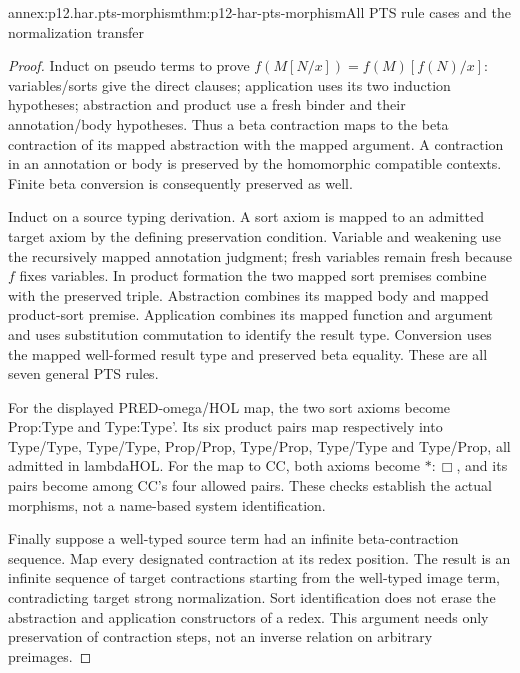 \begin{annexitem}{annex:p12.har.pts-morphism}{thm:p12-har-pts-morphism}{All PTS rule cases and the normalization transfer}
\begin{proof}
Induct on pseudo terms to prove
\(f(M[N/x])=f(M)[f(N)/x]\): variables/sorts give the direct
clauses; application uses its two induction hypotheses; abstraction
and product use a fresh binder and their annotation/body hypotheses.
Thus a beta contraction maps to the beta contraction of its mapped
abstraction with the mapped argument. A contraction in an annotation
or body is preserved by the homomorphic compatible contexts. Finite
beta conversion is consequently preserved as well.

Induct on a source typing derivation. A sort axiom is mapped to an
admitted target axiom by the defining preservation condition. Variable
and weakening use the recursively mapped annotation judgment; fresh
variables remain fresh because \(f\) fixes variables. In product
formation the two mapped sort premises combine with the preserved
triple. Abstraction combines its mapped body and mapped product-sort
premise. Application combines its mapped function and argument and
uses substitution commutation to identify the result type. Conversion
uses the mapped well-formed result type and preserved beta equality.
These are all seven general PTS rules.

For the displayed PRED-omega/HOL map, the two sort axioms become
Prop:Type and Type:Type'. Its six product pairs map respectively into
Type/Type, Type/Type, Prop/Prop, Type/Prop, Type/Type and Type/Prop,
all admitted in lambdaHOL. For the map to CC, both axioms become
\(\ast:\Box\), and its pairs become among CC's four allowed pairs.
These checks establish the actual morphisms, not a name-based system
identification.

Finally suppose a well-typed source term had an infinite beta-contraction
sequence. Map every designated contraction at its redex position.
The result is an infinite sequence of target contractions starting
from the well-typed image term, contradicting target strong
normalization. Sort identification does not erase the abstraction and
application constructors of a redex. This argument needs only preservation
of contraction steps, not an inverse relation on arbitrary preimages.
\end{proof}
\end{annexitem}

